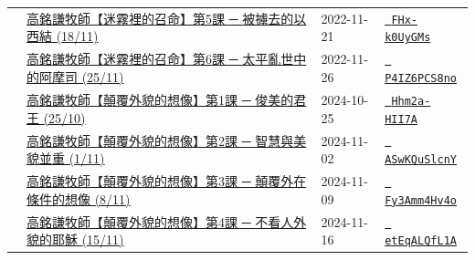 \documentclass{book}
\begin{document}
{\begin{xltabular}{\textwidth}{|p{0.15\textwidth} p{0.6\textwidth}|p{0.07\textwidth} p{0.1\textwidth}|}
    & \hyperref[sec:FHx_k0UyGMs]{高銘謙牧師【迷霧裡的召命】第5課 ─ 被擄去的以西結 (18/11)} & 2022-11-21 & \href{https://youtube.com/watch?v=FHx-k0UyGMs}{\texttt{ FHx-k0UyGMs}} \\
    & \hyperref[sec:P4IZ6PCS8no]{高銘謙牧師【迷霧裡的召命】第6課 ─ 太平亂世中的阿摩司 (25/11)} & 2022-11-26 & \href{https://youtube.com/watch?v=P4IZ6PCS8no}{\texttt{ P4IZ6PCS8no}} \\
    & \hyperref[sec:Hhm2a_HII7A]{高銘謙牧師【顛覆外貌的想像】第1課 ─ 俊美的君王 (25/10)} & 2024-10-25 & \href{https://youtube.com/watch?v=Hhm2a-HII7A}{\texttt{ Hhm2a-HII7A}} \\
    & \hyperref[sec:ASwKQuSlcnY]{高銘謙牧師【顛覆外貌的想像】第2課 ─ 智慧與美貌並重 (1/11)} & 2024-11-02 & \href{https://youtube.com/watch?v=ASwKQuSlcnY}{\texttt{ ASwKQuSlcnY}} \\
    & \hyperref[sec:Fy3Amm4Hv4o]{高銘謙牧師【顛覆外貌的想像】第3課 ─ 顛覆外在條件的想像 (8/11)} & 2024-11-09 & \href{https://youtube.com/watch?v=Fy3Amm4Hv4o}{\texttt{ Fy3Amm4Hv4o}} \\
    & \hyperref[sec:etEqALQfL1A]{高銘謙牧師【顛覆外貌的想像】第4課 ─ 不看人外貌的耶穌 (15/11)} & 2024-11-16 & \href{https://youtube.com/watch?v=etEqALQfL1A}{\texttt{ etEqALQfL1A}} \\
\end{xltabular}
}
\newpage
\end{document}
